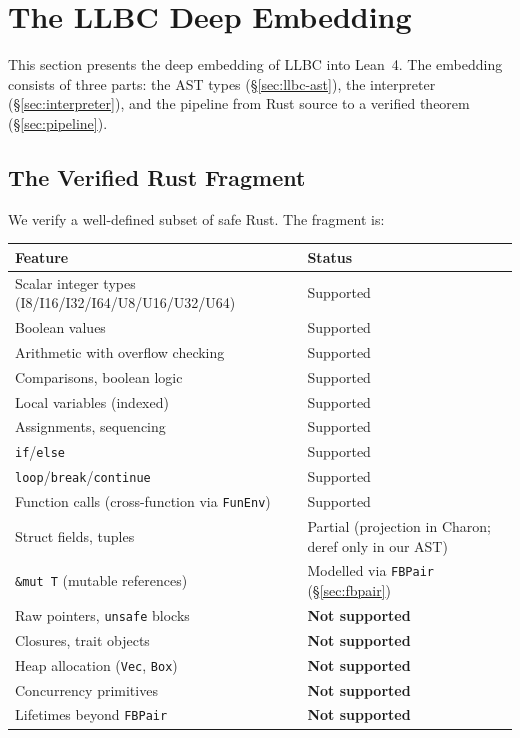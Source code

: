 
\section{The LLBC Deep Embedding}
\label{sec:llbc}

This section presents the deep embedding of LLBC into Lean~4. The embedding
consists of three parts: the AST types (\S\ref{sec:llbc-ast}), the interpreter
(\S\ref{sec:interpreter}), and the pipeline from Rust source to a verified
theorem (\S\ref{sec:pipeline}).

\subsection{The Verified Rust Fragment}
\label{sec:rust-fragment}

We verify a well-defined subset of safe Rust. The fragment is:

\begin{center}
\small
\begin{tabular}{@{}ll@{}}
\toprule
\textbf{Feature}             & \textbf{Status} \\
\midrule
Scalar integer types (I8/I16/I32/I64/U8/U16/U32/U64) & Supported \\
Boolean values               & Supported \\
Arithmetic with overflow checking & Supported \\
Comparisons, boolean logic   & Supported \\
Local variables (indexed)    & Supported \\
Assignments, sequencing      & Supported \\
\texttt{if}/\texttt{else}    & Supported \\
\texttt{loop}/\texttt{break}/\texttt{continue} & Supported \\
Function calls (cross-function via \texttt{FunEnv}) & Supported \\
\midrule
Struct fields, tuples        & Partial (projection in Charon; deref only in our AST) \\
\texttt{\&mut T} (mutable references) & Modelled via \texttt{FBPair} (\S\ref{sec:fbpair}) \\
\midrule
Raw pointers, \texttt{unsafe} blocks & \textbf{Not supported} \\
Closures, trait objects      & \textbf{Not supported} \\
Heap allocation (\texttt{Vec}, \texttt{Box}) & \textbf{Not supported} \\
Concurrency primitives       & \textbf{Not supported} \\
Lifetimes beyond \texttt{FBPair} & \textbf{Not supported} \\
\bottomrule
\end{tabular}
\end{center}


